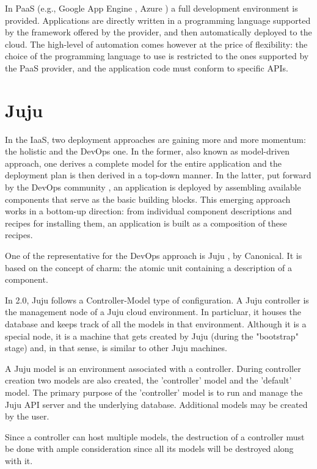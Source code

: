 \documentclass[9pt,twocolumn,twoside]{../../styles/osajnl}
\begin{document}
In PaaS (e.g., Google App Engine \cite{www-googleappengine}, Azure
\cite{www-azure}) a full development environment is
provided. Applications are directly written in a programming language
supported by the framework offered by the provider, and then
automatically deployed to the cloud. The high-level of automation
comes however at the price of flexibility: the choice of the
programming language to use is restricted to the ones supported by the
PaaS provider, and the application code must conform to specific APIs.

\section{Juju}

In the IaaS, two deployment approaches \cite{lascu2015automatic} are
gaining more and more momentum: the holistic and the DevOps one.  In
the former, also known as model-driven approach, one derives a
complete model for the entire application and the deployment plan is
then derived in a top-down manner. In the latter, put forward by the
DevOps community \cite{www-devOps}, an application is deployed by
assembling available components that serve as the basic building
blocks. This emerging approach works in a bottom-up direction: from
individual component descriptions and recipes for installing them, an
application is built as a composition of these recipes.

One of the representative for the DevOps approach is Juju
\cite{www-juju}, by Canonical. It is based on the concept of charm:
the atomic unit containing a description of a component.

In 2.0, Juju follows a Controller-Model type of configuration. A Juju
controller is the management node of a Juju cloud environment. In
particluar, it houses the database and keeps track of all the models
in that environment. Although it is a special node, it is a machine
that gets created by Juju (during the "bootstrap" stage) and, in that
sense, is similar to other Juju machines.

A Juju model is an environment associated with a controller. During
controller creation two models are also created, the 'controller'
model and the 'default' model. The primary purpose of the 'controller'
model is to run and manage the Juju API server and the underlying
database. Additional models may be created by the user.

Since a controller can host multiple models, the destruction of a
controller must be done with ample consideration since all its models
will be destroyed along with it.
\end{document}
